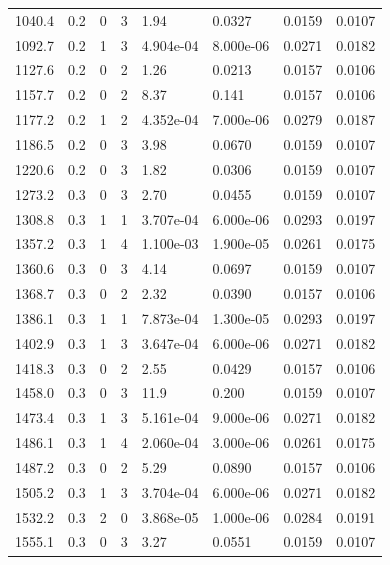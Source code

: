 \documentclass[preview]{standalone}
\begin{document}
{{{\begin{tabular}{L{1.2cm}C{1.2cm} C{0.3cm}C{0.5cm} C{1.4cm}C{1.4cm} C{1.4cm}C{1.4cm}}
  1040.4  &   0.2  & 0     &  3 &  1.94  & 0.0327  & 0.0159 &  0.0107   \\ 
  1092.7  &   0.2  & 1     &  3 &  4.904e-04  & 8.000e-06  & 0.0271 &  0.0182   \\ 
  1127.6  &   0.2  & 0     &  2 &  1.26  & 0.0213  & 0.0157 &  0.0106   \\ 
  1157.7  &   0.2  & 0     &  2 &  8.37  & 0.141  & 0.0157 &  0.0106   \\ 
  1177.2  &   0.2  & 1     &  2 &  4.352e-04  & 7.000e-06  & 0.0279 &  0.0187   \\ 
  1186.5  &   0.2  & 0     &  3 &  3.98  & 0.0670  & 0.0159 &  0.0107   \\ 
  1220.6  &   0.2  & 0     &  3 &  1.82  & 0.0306  & 0.0159 &  0.0107   \\ 
  1273.2  &   0.3  & 0     &  3 &  2.70  & 0.0455  & 0.0159 &  0.0107   \\ 
  1308.8  &   0.3  & 1     &  1 &  3.707e-04  & 6.000e-06  & 0.0293 &  0.0197   \\ 
  1357.2  &   0.3  & 1     &  4 &  1.100e-03  & 1.900e-05  & 0.0261 &  0.0175   \\ 
  1360.6  &   0.3  & 0     &  3 &  4.14  & 0.0697  & 0.0159 &  0.0107   \\ 
  1368.7  &   0.3  & 0     &  2 &  2.32  & 0.0390  & 0.0157 &  0.0106   \\ 
  1386.1  &   0.3  & 1     &  1 &  7.873e-04  & 1.300e-05  & 0.0293 &  0.0197   \\ 
  1402.9  &   0.3  & 1     &  3 &  3.647e-04  & 6.000e-06  & 0.0271 &  0.0182   \\ 
  1418.3  &   0.3  & 0     &  2 &  2.55  & 0.0429  & 0.0157 &  0.0106   \\ 
  1458.0  &   0.3  & 0     &  3 &  11.9  & 0.200  & 0.0159 &  0.0107   \\ 
  1473.4  &   0.3  & 1     &  3 &  5.161e-04  & 9.000e-06  & 0.0271 &  0.0182   \\ 
  1486.1  &   0.3  & 1     &  4 &  2.060e-04  & 3.000e-06  & 0.0261 &  0.0175   \\ 
  1487.2  &   0.3  & 0     &  2 &  5.29  & 0.0890  & 0.0157 &  0.0106   \\ 
  1505.2  &   0.3  & 1     &  3 &  3.704e-04  & 6.000e-06  & 0.0271 &  0.0182   \\ 
  1532.2  &   0.3  & 2     &  0 &  3.868e-05  & 1.000e-06  & 0.0284 &  0.0191   \\ 
  1555.1  &   0.3  & 0     &  3 &  3.27  & 0.0551  & 0.0159 &  0.0107   \\ 

\end{tabular}}}}
\end{document}
